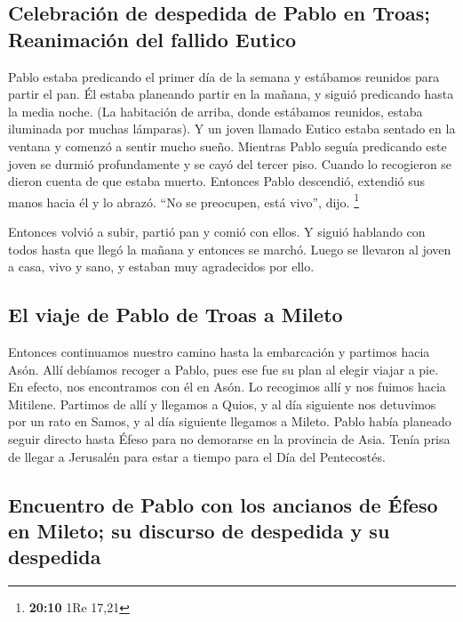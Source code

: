 \hypertarget{celebraciuxf3n-de-despedida-de-pablo-en-troas-reanimaciuxf3n-del-fallido-eutico}{%
\subsection{Celebración de despedida de Pablo en Troas; Reanimación del
fallido
Eutico}\label{celebraciuxf3n-de-despedida-de-pablo-en-troas-reanimaciuxf3n-del-fallido-eutico}}

 Pablo estaba predicando el primer día de la semana y
estábamos reunidos para partir el pan. Él estaba planeando partir en la
mañana, y siguió predicando hasta la media noche.  (La
habitación de arriba, donde estábamos reunidos, estaba iluminada por
muchas lámparas).  Y un joven llamado Eutico estaba
sentado en la ventana y comenzó a sentir mucho sueño. Mientras Pablo
seguía predicando este joven se durmió profundamente y se cayó del
tercer piso. Cuando lo recogieron se dieron cuenta de que estaba muerto.
 Entonces Pablo descendió, extendió sus manos hacia él y
lo abrazó. ``No se preocupen, está vivo'', dijo. \footnote{\textbf{20:10}
  1Re 17,21}

 Entonces volvió a subir, partió pan y comió con ellos. Y
siguió hablando con todos hasta que llegó la mañana y entonces se
marchó.  Luego se llevaron al joven a casa, vivo y sano,
y estaban muy agradecidos por ello.

\hypertarget{el-viaje-de-pablo-de-troas-a-mileto}{%
\subsection{El viaje de Pablo de Troas a
Mileto}\label{el-viaje-de-pablo-de-troas-a-mileto}}

 Entonces continuamos nuestro camino hasta la embarcación
y partimos hacia Asón. Allí debíamos recoger a Pablo, pues ese fue su
plan al elegir viajar a pie.  En efecto, nos encontramos
con él en Asón. Lo recogimos allí y nos fuimos hacia Mitilene.
 Partimos de allí y llegamos a Quios, y al día siguiente
nos detuvimos por un rato en Samos, y al día siguiente llegamos a
Mileto.  Pablo había planeado seguir directo hasta Éfeso
para no demorarse en la provincia de Asia. Tenía prisa de llegar a
Jerusalén para estar a tiempo para el Día del Pentecostés.

\hypertarget{encuentro-de-pablo-con-los-ancianos-de-uxe9feso-en-mileto-su-discurso-de-despedida-y-su-despedida}{%
\subsection{Encuentro de Pablo con los ancianos de Éfeso en Mileto; su
discurso de despedida y su
despedida}\label{encuentro-de-pablo-con-los-ancianos-de-uxe9feso-en-mileto-su-discurso-de-despedida-y-su-despedida}}

